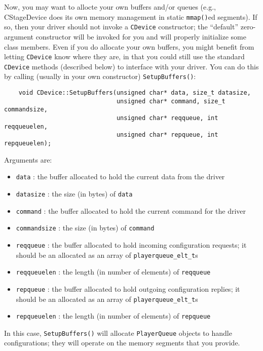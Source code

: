 \documentclass[11pt]{report}
\begin{document}
Now, you may want to allocte your own buffers and/or queues (e.g.,
CStageDevice does its own memory management in static {\tt mmap()}ed
segments).  If so, then your driver should not invoke a {\tt CDevice}
constructor; the ``default'' zero-argument constructor will be invoked for you
and will properly initialize some class members.  Even if you do allocate your
own buffers, you might benefit from letting {\tt CDevice} know where they are,
in that you could still use the standard {\tt CDevice} methods (described
below) to interface with your driver.  You can do this by calling (usually in
your own constructor) {\tt SetupBuffers()}:
\begin{verbatim}
    void CDevice::SetupBuffers(unsigned char* data, size_t datasize, 
                               unsigned char* command, size_t commandsize, 
                               unsigned char* reqqueue, int reqqueuelen, 
                               unsigned char* repqueue, int repqueuelen);
\end{verbatim}
Arguments are:
\begin{itemize}
\item {\tt data} : the buffer allocated to hold the current data from the
driver
\item {\tt datasize} : the size (in bytes) of {\tt data}
\item {\tt command} : the buffer allocated to hold the current command for the 
driver
\item {\tt commandsize} : the size (in bytes) of {\tt command}
\item {\tt reqqueue} : the buffer allocated to hold incoming configuration
requests; it should be an allocated as an array of {\tt playerqueue\_elt\_t}s
\item {\tt reqqueuelen} : the length (in number of elements) of {\tt reqqueue}
\item {\tt repqueue} : the buffer allocated to hold outgoing configuration
replies; it should be an allocated as an array of {\tt playerqueue\_elt\_t}s
\item {\tt repqueuelen} : the length (in number of elements) of {\tt repqueue}
\end{itemize}
In this case, {\tt SetupBuffers()} will allocate {\tt PlayerQueue} objects
to handle configurations; they will operate on the memory segments that you 
provide.
\end{document}

